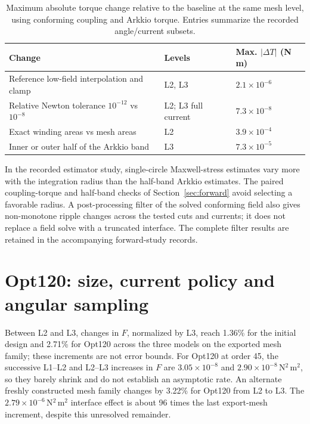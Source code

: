 \documentclass{anvil-paper}
\begin{document}
\begin{table}[H]\centering\small
\caption{Maximum absolute torque change relative to the baseline at the
same mesh level, using conforming coupling and Arkkio torque. Entries
summarize the recorded angle/current subsets.}
\label{tab:sensitivity}
\begin{tabular}{p{.48\linewidth}ll}\toprule
Change & Levels & Max. $|\Delta T|$ (N\,m)\\\midrule
Reference low-field interpolation and clamp & L2, L3 & $2.1\times10^{-6}$\\
Relative Newton tolerance $10^{-12}$ vs $10^{-8}$ & L2; L3 full current & $7.3\times10^{-8}$\\
Exact winding areas vs mesh areas & L2 & $3.9\times10^{-4}$\\
Inner or outer half of the Arkkio band & L3 & $7.3\times10^{-5}$\\
\bottomrule\end{tabular}
\end{table}

In the recorded estimator study, single-circle Maxwell-stress estimates
vary more with the integration radius than the half-band Arkkio estimates.
The paired coupling-torque and half-band checks of
Section~\ref{sec:forward} avoid selecting a favorable radius. A
post-processing filter of the solved conforming field also gives
non-monotone ripple changes across the tested cuts and currents; it does
not replace a field solve with a truncated interface. The complete filter
results are retained in the accompanying forward-study records.

\section{Opt120: size, current policy and angular sampling}\label{sec:opt120-policy}
Between L2 and L3, changes in
$F$, normalized by L3, reach 1.36\% for the initial design and 2.71\%
for Opt120 across the three models on the exported mesh family; these increments are not error bounds.
For Opt120 at order 45, the successive L1--L2 and L2--L3 increases in $F$
are $3.05\times10^{-8}$ and $2.90\times10^{-8}$\,N$^2$\,m$^2$,
so they barely shrink and do not establish an asymptotic rate. An alternate
freshly constructed mesh family changes by 3.22\% for Opt120 from L2 to L3.
The $2.79\times10^{-6}$\,N$^2$\,m$^2$ interface effect is about
96 times the last export-mesh increment, despite this unresolved remainder.
\end{document}
